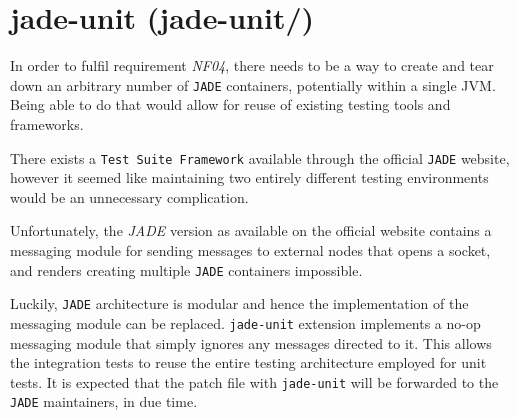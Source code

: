 \section{jade-unit (jade-unit/)}
In order to fulfil requirement \textit{NF04}, there needs to be a way to create and tear down an arbitrary number of \texttt{JADE} containers, potentially within a single JVM. Being able to do that would allow for reuse of existing testing tools and frameworks. 

There exists a \texttt{Test Suite Framework} available through the official \texttt{JADE} website, however it seemed like maintaining two entirely different testing environments would be an unnecessary complication.

Unfortunately, the \textit{JADE} version as available on the official website contains a messaging module for sending messages to external nodes that opens a socket, and renders creating multiple \texttt{JADE} containers impossible.

Luckily, \texttt{JADE} architecture is modular and hence the implementation of the messaging module can be replaced. \texttt{jade-unit} extension implements a no-op messaging module that simply ignores any messages directed to it. This allows the integration tests to reuse the entire testing architecture employed for unit tests. It is expected that the patch file with \texttt{jade-unit} will be forwarded to the \texttt{JADE} maintainers, in due time.
